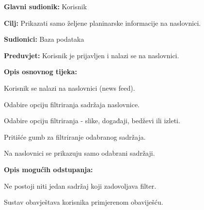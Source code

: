 			\noindent {}
			\begin{packed_item}
				
				\item \textbf{Glavni sudionik: } Korisnik
				\item  \textbf{Cilj:} Prikazati samo željene planinarske informacije na naslovnici.
				\item  \textbf{Sudionici:} Baza podataka
				\item  \textbf{Preduvjet:} Korisnik je prijavljen i nalazi se na naslovnici.
				\item  \textbf{Opis osnovnog tijeka:}
				
				\item[] \begin{packed_enum}
					
					\item Korisnik se nalazi na naslovnici (news feed).
					\item Odabire opciju filtriranja sadržaja naslovnice.
					\item Odabire opciju filtriranja - slike, događaji, bedževi ili izleti.
					\item Pritišće gumb za filtriranje odabranog sadržaja.
					\item Na naslovnici se prikazuju samo odabrani sadržaji.
					
				\end{packed_enum}
				
				\item  \textbf{Opis mogućih odstupanja:}
				
				\item[] \begin{packed_item}
					
					\item[3.a] Ne postoji niti jedan sadržaj koji zadovoljava filter. 
					\item[] \begin{packed_enum}
						
						\item Sustav obavještava korisnika primjerenom obaviješću.
					\end{packed_enum}
					
					
				\end{packed_item}
			\end{packed_item}
		
